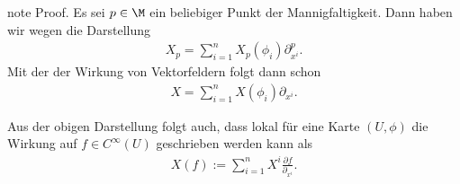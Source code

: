 \documentclass[letterpaper,10pt,german]{jupyterBook}
\begin{document}
\begin{sphinxadmonition}{note}
\sphinxAtStartPar
Proof. Es sei \(p\in\M\) ein beliebiger Punkt der Mannigfaltigkeit.
Dann haben wir wegen {\hyperref[\detokenize{manifolds/tangential:thm:tanbasis}]{}} die Darstellung
\begin{equation*}
\begin{split}X_p = \sum_{i=1}^n X_p(\phi_i) \partial_{x^i}^p.\end{split}
\end{equation*}
\sphinxAtStartPar
Mit der {\hyperref[\detokenize{manifolds/tangential:def:wirkung}]{}} der Wirkung von Vektorfeldern folgt dann schon
\begin{equation*}
\begin{split}X = \sum_{i=1}^n X(\phi_i) \partial_{x^i}.\end{split}
\end{equation*}\end{sphinxadmonition}

\sphinxAtStartPar
Aus der obigen Darstellung folgt auch, dass lokal für eine Karte \((U,\phi)\) die Wirkung auf \(f\in C^\infty(U)\) geschrieben werden kann als
\begin{equation*}
\begin{split}X(f) := \sum_{i=1}^n X^i \frac{\partial f}{\partial_{x^i}}.\end{split}
\end{equation*}
\end{document}
